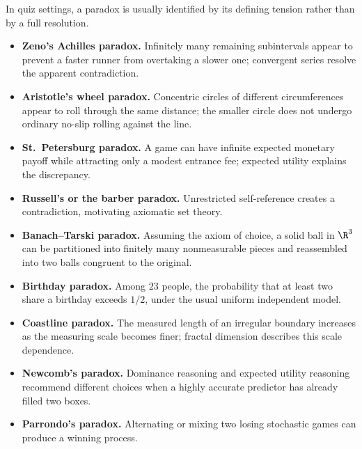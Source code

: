     \begin{fact}
        In quiz settings, a paradox is usually identified by its defining
        tension rather than by a full resolution.
        \begin{itemize}
            \item \textbf{Zeno's Achilles paradox.} Infinitely many remaining
                  subintervals appear to prevent a faster runner from overtaking
                  a slower one; convergent series resolve the apparent
                  contradiction.
            \item \textbf{Aristotle's wheel paradox.} Concentric circles of
                  different circumferences appear to roll through the same
                  distance; the smaller circle does not undergo ordinary
                  no-slip rolling against the line.
            \item \textbf{St.\ Petersburg paradox.} A game can have infinite
                  expected monetary payoff while attracting only a modest
                  entrance fee; expected utility explains the discrepancy.
            \item \textbf{Russell's or the barber paradox.} Unrestricted
                  self-reference creates a contradiction, motivating axiomatic
                  set theory.
            \item \textbf{Banach--Tarski paradox.} Assuming the axiom of choice,
                  a solid ball in $\R^3$ can be partitioned into finitely many
                  nonmeasurable pieces and reassembled into two balls congruent
                  to the original.
            \item \textbf{Birthday paradox.} Among $23$ people, the probability
                  that at least two share a birthday exceeds $1/2$, under the
                  usual uniform independent model.
            \item \textbf{Coastline paradox.} The measured length of an
                  irregular boundary increases as the measuring scale becomes
                  finer; fractal dimension describes this scale dependence.
            \item \textbf{Newcomb's paradox.} Dominance reasoning and expected
                  utility reasoning recommend different choices when a highly
                  accurate predictor has already filled two boxes.
            \item \textbf{Parrondo's paradox.} Alternating or mixing two losing
                  stochastic games can produce a winning process.
        \end{itemize}
    \end{fact}

